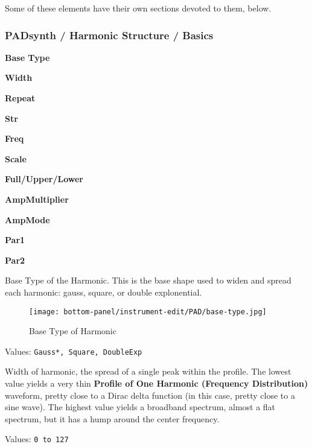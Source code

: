    Some of these elements have their own sections devoted to them, below.

\subsubsection{PADsynth / Harmonic Structure / Basics}
\label{subsubsec:padsynth_harmonic_structure_basics}

   \begin{enumber}
      \item \textbf{Base Type}
      \item \textbf{Width}
      \item \textbf{Repeat}
      \item \textbf{Str}
      \item \textbf{Freq}
      \item \textbf{Scale}
      \item \textbf{Full/Upper/Lower}
      \item \textbf{AmpMultiplier}
      \item \textbf{AmpMode}
      \item \textbf{Par1}
      \item \textbf{Par2}
   \end{enumber}

   \setcounter{ItemCounter}{0}      %

   Base Type of the Harmonic.
   This is the base shape used to widen and spread each harmonic:
   gauss, square, or double explonential.

\begin{figure}[H]
   \centering
   \texttt{[image: bottom-panel/instrument-edit/PAD/base-type.jpg]}
   \caption{Base Type of Harmonic}
   \label{fig:padsynth_base_type_of_harmonic}
\end{figure}

   Values: \texttt{Gauss*, Square, DoubleExp}

   Width of harmonic, the spread of a single peak within the profile.
   The lowest value yields a very thin
   \textbf{Profile of One Harmonic (Frequency Distribution)}
   waveform, pretty close to a Dirac delta function (in this case, pretty close
   to a sine wave).
   The highest value yields a broadband spectrum, almost a flat spectrum, but
   it has a hump around the center frequency.

   Values: \texttt{0 to 127}

